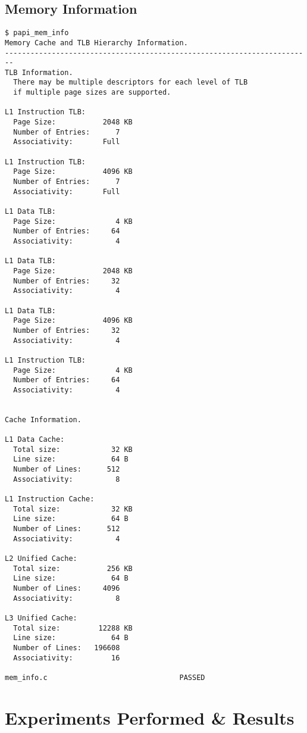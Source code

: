 \documentclass{article}
\begin{document}
\subsection{Memory Information}
\begin{lstlisting}
$ papi_mem_info
Memory Cache and TLB Hierarchy Information.
------------------------------------------------------------------------
TLB Information.
  There may be multiple descriptors for each level of TLB
  if multiple page sizes are supported.

L1 Instruction TLB:
  Page Size:           2048 KB
  Number of Entries:      7
  Associativity:       Full

L1 Instruction TLB:
  Page Size:           4096 KB
  Number of Entries:      7
  Associativity:       Full

L1 Data TLB:
  Page Size:              4 KB
  Number of Entries:     64
  Associativity:          4

L1 Data TLB:
  Page Size:           2048 KB
  Number of Entries:     32
  Associativity:          4

L1 Data TLB:
  Page Size:           4096 KB
  Number of Entries:     32
  Associativity:          4

L1 Instruction TLB:
  Page Size:              4 KB
  Number of Entries:     64
  Associativity:          4


Cache Information.

L1 Data Cache:
  Total size:            32 KB
  Line size:             64 B
  Number of Lines:      512
  Associativity:          8

L1 Instruction Cache:
  Total size:            32 KB
  Line size:             64 B
  Number of Lines:      512
  Associativity:          4

L2 Unified Cache:
  Total size:           256 KB
  Line size:             64 B
  Number of Lines:     4096
  Associativity:          8

L3 Unified Cache:
  Total size:         12288 KB
  Line size:             64 B
  Number of Lines:   196608
  Associativity:         16

mem_info.c                               PASSED
\end{lstlisting}

\newpage
\section{Experiments Performed \& Results}
\end{document}
